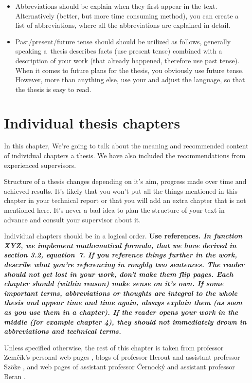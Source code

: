 {{\begin{itemize}
  \item{Abbreviations should be explain when they first appear in the text. Alternatively (better, but more time consuming method), you can create a list of abbreviations, where all the abbreviations are explained in detail.}
  \item{Past/present/future tense should should be utilized as follows, generally speaking a~thesis describes facts (use present tense) combined with a description of your work (that already happened, therefore use past tense). When it comes to future plans for the thesis, you obviously use future tense. However, more than anything else, use your  and adjust the language, so that the thesis is easy to read.}
\end{itemize}
\rm


\chapter{Individual thesis chapters}
\label{kapitoly}

In this chapter, We're going to talk about the meaning and recommended content of individual chapters a thesis. We have also included the recommendations from experienced supervisors.

Structure of a thesis changes depending on it's aim, progress made over time and achieved results. It's likely that you won't put all the things mentioned in this chapter in your technical report or that you will add an extra chapter that is not mentioned here. It's never a bad idea to plan the structure of your text in advance and consult your supervisor about it.

Individual chapters should be in a logical order. \bf Use references. \rm \it In function XYZ, we implement mathematical formula, that we have derived in section 3.2, equation~7. \rm If you reference things further in the work, describe what you're referencing in roughly two sentences. The reader should not get lost in your work, don't make them flip pages. \bf Each chapter should (within reason) make sense on it's own. \rm If some important terms, abbreviations or thoughts are integral to the whole thesis and appear time and time again, always explain them (as soon as you use them in a chapter). If the reader opens your work in the middle (for example chapter 4), they should not immediately drown in abbreviations and technical terms.\cite{rady}

Unless specified otherwise, the rest of this chapter is taken from professor Zemčík's personal web pages \cite{Zemcik}, blogs of professor Herout \cite{Herout} and assistant professor Szöke \cite{rady}, and web pages of assistant professor Černocký \cite{Cernocky} and assistant professor Beran \cite{Beran}.

}}
